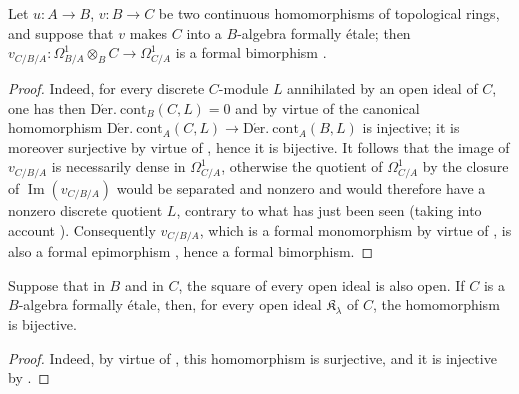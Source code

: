 \begin{proposition}[20.7.6]
\label{0.20.7.6}
Let $u:A\to B$, $v:B\to C$ be two continuous homomorphisms of topological rings, and suppose that $v$ makes $C$ into a $B$-algebra formally \'{e}tale; then $v_{C/B/A}:\Omega^1_{B/A}\otimes_B C\to\Omega^1_{C/A}$ is a formal bimorphism .
\end{proposition}

\begin{proof}
Indeed, for every discrete $C$-module $L$ annihilated by an open ideal of $C$, one has then  $\operatorname{D\acute{e}r.\ cont}_B(C,L)=0$ and by virtue of  the canonical homomorphism
$\operatorname{D\acute{e}r.\ cont}_A(C,L)\to\operatorname{D\acute{e}r.\ cont}_A(B,L)$ is injective; it is moreover surjective by virtue of , hence it is bijective. It follows that the image of $v_{C/B/A}$ is necessarily dense in $\Omega^1_{C/A}$, otherwise the quotient of $\Omega^1_{C/A}$ by the closure of $\operatorname{Im}(v_{C/B/A})$ would be separated and nonzero and would therefore have a nonzero discrete quotient $L$, contrary to what has just been seen (taking into account ). Consequently $v_{C/B/A}$, which is a formal monomorphism by virtue of , is also a formal epimorphism , hence a formal bimorphism.
\end{proof}

\begin{corollary}[20.7.7]
\label{0.20.7.7}
Suppose that in $B$ and in $C$, the square of every open ideal is also open.
If $C$ is a $B$-algebra formally \'{e}tale, then, for every open ideal $\mathfrak{K}_\lambda$ of $C$, the homomorphism \textup{} is bijective.
\end{corollary}

\begin{proof}
Indeed, by virtue of , this homomorphism is surjective, and it is injective by .
\end{proof}

